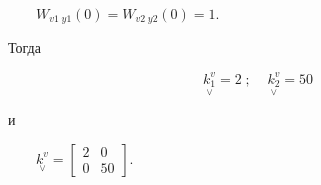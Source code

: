 \documentclass[a4paper]{article}
\begin{document}
{\begin{russian}\sffamily
\textenglish{\ \ }\ \  $W_{\mathit{v1}\;\mathit{y1}}(0)=W_{\mathit{v2}\;\mathit{y2}}(0)=1$.
\end{russian}}

{\begin{russian}\sffamily
Тогда
\end{russian}}

\begin{equation*}
\underset{\vee }{k_1^v}=2\;;\;\;\;\;\underset{\vee }{k_2^v}=50\;
\end{equation*}
{\begin{russian}\sffamily
и
\end{russian}}

{\begin{russian}\sffamily
\textenglish{\ \ }\ \  $\underset{\vee }{k^v}=\left[\begin{matrix}2&0\\0&50\end{matrix}\right]$.
\end{russian}}
\end{document}
